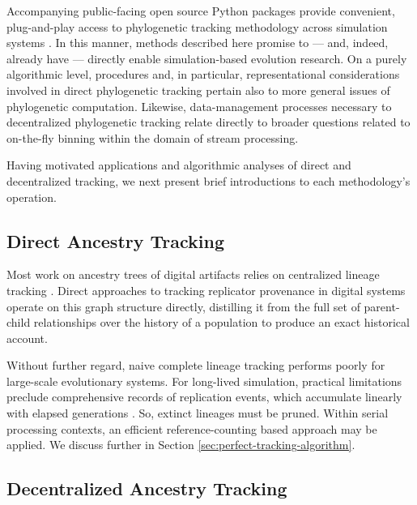 Accompanying public-facing open source Python packages provide convenient, plug-and-play access to phylogenetic tracking methodology across simulation systems \citep{moreno2022hstrat,dolson2023phylotrackpy}.
In this manner, methods described here promise to --- and, indeed, already have --- directly enable simulation-based evolution research.
On a purely algorithmic level, procedures and, in particular, representational considerations involved in direct phylogenetic tracking pertain also to more general issues of phylogenetic computation.
Likewise, data-management processes necessary to decentralized phylogenetic tracking relate directly to broader questions related to on-the-fly binning within the domain of stream processing. %

Having motivated applications and algorithmic analyses of direct and decentralized tracking, we next present brief introductions to each methodology's operation.

\subsection{Direct Ancestry Tracking}

Most work on ancestry trees of digital artifacts relies on centralized lineage tracking \citep{friggeri2014rumor,cohen1987computer,dolson2023phylotrackpy}.
Direct approaches to tracking replicator provenance in digital systems operate on this graph structure directly, distilling it from the full set of parent-child relationships over the history of a population to produce an exact historical account.

Without further regard, naive complete lineage tracking performs poorly for large-scale evolutionary systems.
For long-lived simulation, practical limitations preclude comprehensive records of replication events, which accumulate linearly with elapsed generations \citep{dolson2023algorithms}.
So, extinct lineages must be pruned.
Within serial processing contexts, an efficient reference-counting based approach may be applied.
We discuss further in Section \ref{sec:perfect-tracking-algorithm}.

\subsection{Decentralized Ancestry Tracking}

